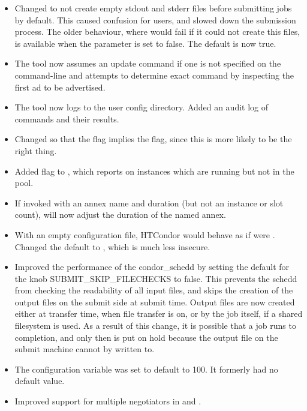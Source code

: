 \begin{itemize}

\item Changed  to not create empty stdout and stderr files before
submitting jobs by default.  This caused confusion for users, and slowed down
the submission process.  The older behaviour, where  would fail
if it could not create this files, is available when the parameter
 is set to false.  The default is now true.

\item The  tool now assumes an update command if one is not
specified on the command-line and attempts to determine exact command by
inspecting the first ad to be advertised.

\item The  tool now logs to the user config directory.  Added an
audit log of  commands and their results.

\item Changed  so that the  flag implies the
 flag, since this is more likely to be the right thing.

\item Added  flag to , which reports on
instances which are running but not in the pool.

\item If invoked with an annex name and duration (but not an instance or slot
count),  will now adjust the duration of the named annex.

\item With an empty configuration file, HTCondor would behave as if
 were \Expr{*}.  Changed the default to
, which is much less insecure.

\item Improved the performance of the condor\_schedd by setting the
default for the knob SUBMIT\_SKIP\_FILECHECKS to false.  This prevents
the schedd from checking the readability of all input files, and skips
the creation of the output files on the submit side at submit time.
Output files are now created either at transfer time, when file transfer
is on, or by the job itself, if a shared filesystem is used.  As a result
of this change, it is possible that a job runs to completion, and only
then is put on hold because the output file on the submit machine cannot
by written to.

\item The configuration variable 
was set to default to 100. It formerly had no default value.

\item Improved support for multiple negotiators in 
and .

\end{itemize}

